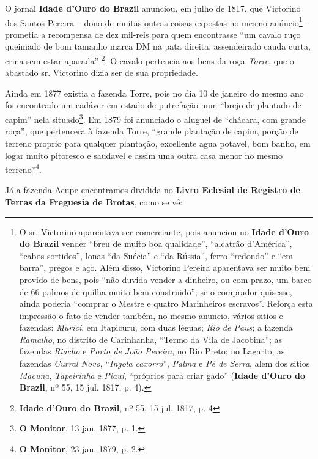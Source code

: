 O jornal \textbf{Idade d'Ouro do Brazil} anunciou, em julho de 1817, que Victorino dos Santos Pereira -- dono de muitas outras coisas expostas no mesmo anúncio\footnote{O sr. Victorino aparentava ser comerciante, pois anunciou no \textbf{Idade d'Ouro do Brazil} vender ``breu de muito boa qualidade'', ``alcatrão d'América'', ``cabos sortidos'', lonas ``da Suécia'' e ``da Rússia'', ferro ``redondo'' e ``em barra'', pregos e aço. Além disso, Victorino Pereira aparentava ser muito bem provido de bens, pois ``não duvida vender a dinheiro, ou com prazo, um barco de 66 palmos de quilha muito bem construido''; se o comprador quisesse, ainda poderia ``comprar o Mestre e quatro Marinheiros escravos''. Reforça esta impressão o fato de vender também, no mesmo anuncio, vários sitios e fazendas: \textit{Murici}, em Itapicuru, com duas léguas; \textit{Rio de Paus}; a fazenda \textit{Ramalho}, no distrito de Carinhanha, ``Termo da Vila de Jacobina''; as fazendas \textit{Riacho} e \textit{Porto de João Pereira}, no Rio Preto; no Lagarto, as fazendas \textit{Curral Novo}, ``\textit{Ingola caxorro}'', \textit{Palma} e \textit{Pé de Serra}, alem dos sitios \textit{Macuna}, \textit{Tapeirinha} e \textit{Piauí}, ``próprios para criar gado'' (\textbf{Idade d'Ouro do Brazil}, nº 55, 15 jul. 1817, p. 4).} -- prometia a recompensa de dez mil-reis para quem encontrasse ``um cavalo ruço queimado de bom tamanho marca DM na pata direita, assendeirado cauda curta, crina sem estar aparada'' \footnote{\textbf{Idade d'Ouro do Brazil}, nº 55, 15 jul. 1817, p. 4}. O cavalo pertencia aos bens da roça \textit{Torre}, que o abastado sr. Victorino dizia ser de sua propriedade.

Ainda em 1877 existia a fazenda Torre, pois no dia 10 de janeiro do mesmo ano foi encontrado um cadáver em estado de putrefação num ``brejo de plantado de capim'' nela situado\footnote{\textbf{O Monitor}, 13 jan. 1877, p. 1.}. Em 1879 foi anunciado o aluguel de ``chácara, com grande roça'', que pertencera à fazenda Torre, ``grande plantação de capim, porção de terreno proprio para qualquer plantação, excellente agua potavel, bom banho, em logar muito pitoresco e saudavel e assim uma outra casa menor no mesmo terreno''\footnote{\textbf{O Monitor}, 23 jan. 1879, p. 2.}.

Já a fazenda Acupe encontramos dividida no \textbf{Livro Eclesial de Registro de Terras da Freguesia de Brotas}, como se vê:

